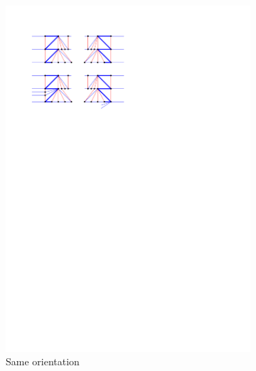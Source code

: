 \begin{figure}
    \centering
    \begin{subfigure}[b]{0.45 \textwidth}
        \includegraphics[width = \textwidth]{unifiedAlgo/img/post/sameChain}
        \caption{Same orientation}
    \end{subfigure}
    ~
    \begin{subfigure}[b]{0.45 \textwidth}

\end{subfigure}
\end{figure}
